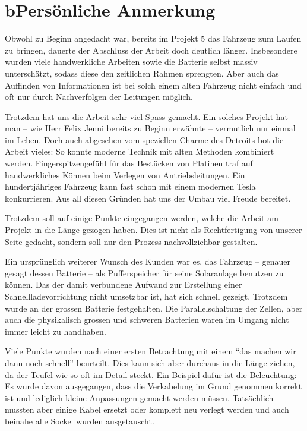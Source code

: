 \chapter*{b\quad Persönliche Anmerkung}
Obwohl zu Beginn angedacht war, bereits im Projekt 5 das Fahrzeug zum Laufen zu bringen, dauerte der Abschluss der Arbeit doch deutlich länger. Insbesondere wurden viele handwerkliche Arbeiten sowie die Batterie selbst massiv unterschätzt, sodass diese den zeitlichen Rahmen sprengten. Aber auch das Auffinden von Informationen ist bei solch einem alten Fahrzeug nicht einfach und oft nur durch Nachverfolgen der Leitungen möglich.

Trotzdem hat uns die Arbeit sehr viel Spass gemacht. Ein solches Projekt hat man -- wie Herr Felix Jenni bereits zu Beginn erwähnte -- vermutlich nur einmal im Leben. Doch auch abgesehen vom speziellen Charme des Detroits bot die Arbeit vieles: So konnte moderne Technik mit alten Methoden kombiniert werden. Fingerspitzengefühl für das Bestücken von Platinen traf auf handwerkliches Können beim Verlegen von Antriebsleitungen. Ein hundertjähriges Fahrzeug kann fast schon mit einem modernen Tesla konkurrieren. Aus all diesen Gründen hat uns der Umbau viel Freude bereitet.

Trotzdem soll auf einige Punkte eingegangen werden, welche die Arbeit am Projekt in die Länge gezogen haben. Dies ist nicht als Rechtfertigung von unserer Seite gedacht, sondern soll nur den Prozess nachvollziehbar gestalten.

Ein ursprünglich weiterer Wunsch des Kunden war es, das Fahrzeug -- genauer gesagt dessen Batterie -- als Pufferspeicher für seine Solaranlage benutzen zu können. Das der damit verbundene Aufwand zur Erstellung einer Schnellladevorrichtung nicht umsetzbar ist, hat sich schnell gezeigt. Trotzdem wurde an der grossen Batterie festgehalten. Die Parallelschaltung der Zellen, aber auch die physikalisch grossen und schweren Batterien waren im Umgang nicht immer leicht zu handhaben.

Viele Punkte wurden nach einer ersten Betrachtung mit einem "`das machen wir dann noch schnell"' beurteilt. Dies kann sich aber durchaus in die Länge ziehen, da der Teufel wie so oft im Detail steckt. Ein Beispiel dafür ist die Beleuchtung: Es wurde davon ausgegangen, dass die Verkabelung im Grund genommen korrekt ist und lediglich kleine Anpassungen gemacht werden müssen. Tatsächlich mussten aber einige Kabel ersetzt oder komplett neu verlegt werden und auch beinahe alle Sockel wurden ausgetauscht.

